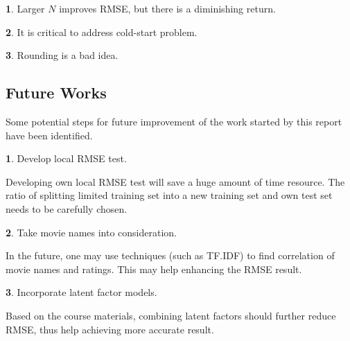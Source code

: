 \documentclass{ece}
\begin{document}
\textbf{1}. Larger $N$ improves RMSE, but there is a diminishing return.

\textbf{2}. It is critical to address cold-start problem.

\textbf{3}. Rounding is a bad idea.

\subsection{Future Works}

Some potential steps for future improvement of the work started by this report have been identified.

\textbf{1}. Develop local RMSE test.

Developing own local RMSE test will save a huge amount of time resource. The ratio of splitting limited training set into a new training set and own test set needs to be carefully chosen. 

\textbf{2}. Take movie names into consideration.

In the future, one may use techniques (such as TF.IDF) to find correlation of movie names and ratings.
This may help enhancing the RMSE result.

\textbf{3}. Incorporate latent factor models.

Based on the course materials, combining latent factors should further reduce RMSE, thus help achieving more accurate result.


\printbibliography[heading=none]


%
%
\end{document}
